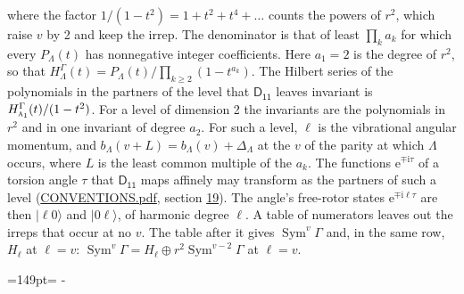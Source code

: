 \documentclass[10pt,a4paper]{article}
\newcommand{\needspace}[1]{\par\penalty-100\begingroup\dimen0=#1\relax\dimen2=\pagegoal
  \advance\dimen2-\pagetotal\ifdim\dimen0>\dimen2\relax\ifdim\dimen2>0pt\vfil\break\fi\fi
  \endgroup}
\numberwithin{equation}{section}
\newcommand{\grp}[1]{\mathsf{#1}}
\newcommand{\irr}[1]{\text{\normalfont\scshape #1}}
\newcommand{\iunit}{\mathrm{i}}
\newcommand{\expe}{\mathrm{e}}
\newcommand{\occ}[1]{\lvert #1\rangle}
\begin{document}
where the factor $1/(1 - t^2) = 1 + t^2 + t^4 + \dots$ counts the powers of $r^2$, which raise $v$ by 2 and keep the irrep. The denominator is that of least $\prod_k a_k$ for which every $P_\Lambda(t)$ has nonnegative integer coefficients. Here $a_1 = 2$ is the degree of $r^2$, so that $H^{\Gamma}_\Lambda(t) = P_\Lambda(t)/\prod_{k\ge2}(1 - t^{a_k})$. The Hilbert series of the polynomials in the partners of the level that $\grp{D_{11}}$ leaves invariant is $H^{\Gamma}_{\irr{a}_{1}}(t)/(1 - t^2)$. For a level of dimension 2 the invariants are the polynomials in $r^2$ and in one invariant of degree $a_2$. \label{n:index.overtone.period}\label{n:index.increment.unitary}For such a level, $\ell$ is the vibrational angular momentum, and $b_\Lambda(v + L) = b_\Lambda(v) + \Delta_\Lambda$ at the $v$ of the parity at which $\Lambda$ occurs, where $L$ is the least common multiple of the $a_k$. \label{n:local.torsion.angle}The functions $\expe^{\mp\iunit\tau}$ of a torsion angle $\tau$ that $\grp{D_{11}}$ maps affinely may transform as the partners of such a level (\href{../../CONVENTIONS.pdf}{CONVENTIONS.pdf}, section \href{../../CONVENTIONS.pdf\#conv.19}{19}). The angle's free-rotor states $\expe^{\mp\iunit\ell\tau}$ are then $\occ{\ell 0}$ and $\occ{0 \ell}$, of harmonic degree $\ell$. A table of numerators leaves out the irreps that occur at no $v$. The table after it gives $\operatorname{Sym}^{v}\Gamma$ and, in the same row, $H_\ell$ at $\ell = v$: $\operatorname{Sym}^{v}\Gamma = H_\ell \oplus r^2\operatorname{Sym}^{v-2}\Gamma$ at $\ell = v$.
\needspace{149pt}
\end{document}

